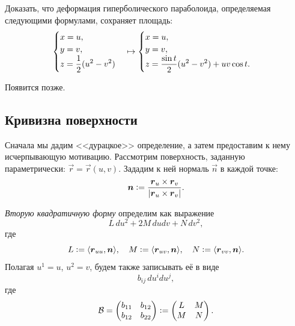 \begin{problem}
	Доказать, что деформация гиперболического параболоида, определяемая следующими формулами, сохраняет площадь:
	\[
		\begin{cases}
			x = u,\\
			y = v,\\
			\ds z = \frac{1}{2}(u^2 - v^2)
		\end{cases}
		\mapsto
		\begin{cases}
			x = u,\\
			y = v,\\
			\ds z = \frac{\sin t}{2}(u^2 - v^2) + uv\cos t.
		\end{cases}
	\]
\end{problem}

\begin{solution} %
	Появится позже.
\end{solution}


\subsection{Кривизна поверхности}

Сначала мы дадим <<дурацкое>> определение, а затем предоставим к нему исчерпывающую мотивацию. Рассмотрим поверхность, заданную параметрически: $\vec{r} = \vec{r}(u, v)$. Зададим к ней нормаль $\vec{n}$ в каждой точке:
\[
	\vec{n} \vcentcolon = \frac{\vec{r}_u \times \vec{r}_v}{\abs{\vec{r}_u \times \vec{r}_v}}.
\]

\begin{definition}
	\textit{Вторую квадратичную форму} определим как выражение
	\[
		L\,du^2 + 2M\,dudv + N\,dv^2,
	\]
	где
	\[
		L \vcentcolon = \langle\vec{r}_{uu}, \vec{n}\rangle,\quad M \vcentcolon = \langle\vec{r}_{uv}, \vec{n}\rangle,\quad N \vcentcolon = \langle\vec{r}_{vv}, \vec{n}\rangle.
	\]
	Полагая $u^1 = u$, $u^2 = v$, будем также записывать её в виде
	\[
		b_{ij}\,du^idu^j,
	\]
	где
	\[
		\B = \begin{pmatrix}
			b_{11} & b_{12}\\
			b_{12} & b_{22}
		\end{pmatrix} \vcentcolon =
		\begin{pmatrix}
			L & M\\
			M & N
		\end{pmatrix}.
	\]
\end{definition}

